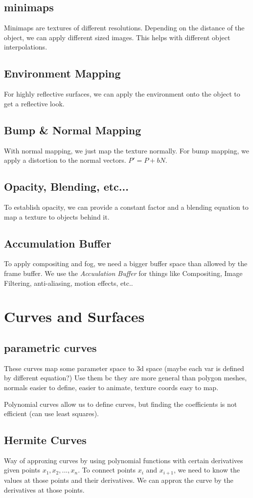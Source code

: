 \documentclass[landscape,4pt,a4paper]{article}
\begin{document}
\begin{multicols*}{5}
			\subsection{minimaps}
				Minimaps are textures of different resolutions. Depending on the distance of the object, we can apply 
				different sized images. This helps with different object interpolations.
			\subsection{Environment Mapping}
				For highly reflective surfaces, we can apply the environment onto the object to get a reflective look.		
			\subsection{Bump \& Normal Mapping}
				With normal mapping, we just map the texture normally. For bump mapping, we apply a distortion to the normal
				vectors. $P' = P + bN$.
			\subsection{Opacity, Blending, etc...}
				To establish opacity, we can provide a constant factor and a blending equation to map a texture to objects 
				behind it.
			\subsection{Accumulation Buffer}
				To apply compositing and fog, we need a bigger buffer space than allowed by the frame buffer. We use the 
				\textit{Accuulation Buffer} for things like Compositing, Image Filtering, anti-aliasing, motion effects, etc..
	\section{Curves and Surfaces}
			\subsection{parametric curves}
				These curves map some parameter space to 3d space (maybe each var is defined by different equation?) Use them bc
				they are more general than polygon meshes, normals easier to define, easier to animate, texture coords easy to map.
				
				Polynomial curves allow us to define curves, but finding the coefficients is not efficient (can use least squares).
			\subsection{Hermite Curves}
				Way of approxing curves by using polynomial functions with certain derivatives given points $x_{1},x_{2},...,x_{n}$.
				To connect points $x_{i}$ and $x_{i+1}$, we need to know the values at those points and their derivatives. We can
				approx the curve by the derivatives at those points.


\end{multicols*}
\end{document}
